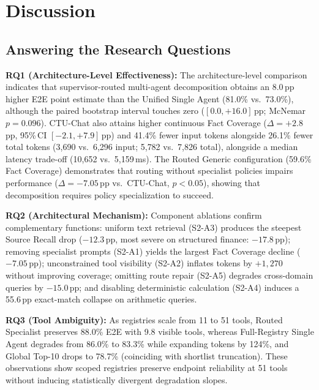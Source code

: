 \section{Discussion}
\label{sec:discussion}

\subsection{Answering the Research Questions}

\textbf{RQ1 (Architecture-Level Effectiveness):}
The architecture-level comparison indicates that supervisor-routed multi-agent decomposition obtains an 8.0\,pp higher E2E point estimate than the Unified Single Agent (81.0\% vs.\ 73.0\%), although the paired bootstrap interval touches zero ($[0.0, +16.0]$\,pp; McNemar $p{=}0.096$). CTU-Chat also attains higher continuous Fact Coverage ($\Delta{=}+2.8$\,pp, 95\%\,CI $[-2.1,+7.9]$\,pp) and 41.4\% fewer input tokens alongside 26.1\% fewer total tokens (3{,}690 vs.\ 6{,}296 input; 5{,}782 vs.\ 7{,}826 total), alongside a median latency trade-off (10{,}652 vs.\ 5{,}159\,ms). The Routed Generic configuration (59.6\% Fact Coverage) demonstrates that routing without specialist policies impairs performance ($\Delta{=}-7.05$\,pp vs.\ CTU-Chat, $p{<}0.05$), showing that decomposition requires policy specialization to succeed.

\textbf{RQ2 (Architectural Mechanism):}
Component ablations confirm complementary functions: uniform text retrieval (S2-A3) produces the steepest Source Recall drop ($-12.3$\,pp, most severe on structured finance: $-17.8$\,pp); removing specialist prompts (S2-A1) yields the largest Fact Coverage decline ($-7.05$\,pp); unconstrained tool visibility (S2-A2) inflates tokens by $+1{,}270$ without improving coverage; omitting route repair (S2-A5) degrades cross-domain queries by $-15.0$\,pp; and disabling deterministic calculation (S2-A4) induces a 55.6\,pp exact-match collapse on arithmetic queries.

\textbf{RQ3 (Tool Ambiguity):}
As registries scale from 11 to 51 tools, Routed Specialist preserves 88.0\% E2E with 9.8 visible tools, whereas Full-Registry Single Agent degrades from 86.0\% to 83.3\% while expanding tokens by 124\%, and Global Top-10 drops to 78.7\% (coinciding with shortlist truncation). These observations show scoped registries preserve endpoint reliability at 51 tools without inducing statistically divergent degradation slopes.

